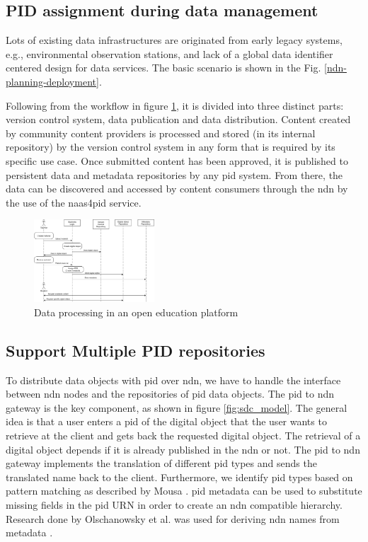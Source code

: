 \documentclass[conference]{IEEEtran}
\begin{document}
\subsection{PID assignment during data management}
Lots of existing data infrastructures are originated from early legacy systems, e.g., environmental observation stations, and lack of a global data identifier centered design for data services. The basic scenario is shown in the Fig. \ref{ndn-planning-deployment}. 

Following from the workflow in figure \ref{fig:sequence}, it is divided into three distinct parts: version control system, data publication and data distribution. Content created by community content providers is processed and stored (in its internal repository) by the version control system in any form that is required by its specific use case. Once submitted content has been approved, it is published to persistent data and metadata repositories by any \gls{pid} system. From there, the data can be discovered and accessed by content consumers through the \gls{ndn} by the use of the \gls{naas4pid} service.

\begin{figure}[h]
\centering
\label{fig:sequence}
\includegraphics[width=0.4\textwidth]{images/sequence.png}
\caption{Data processing in an open education platform}
\end{figure}


\subsection{Support Multiple PID repositories}
To distribute data objects with \gls{pid} over \gls{ndn}, we have to handle the interface between \gls{ndn} nodes and the repositories of \gls{pid} data objects. The \gls{pid} to \gls{ndn} gateway is the key component, as shown in figure \ref{fig:sdc_model}. The general idea is that a user enters a \gls{pid} of the digital object that the user wants to retrieve at the client and gets back the requested digital object. The retrieval of a digital object depends if it is already published in the \gls{ndn} or not. The \gls{pid} to \gls{ndn} gateway implements the translation of different \gls{pid} types and sends the translated name back to the client. Furthermore, we identify \gls{pid} types based on pattern matching as described by Mousa \cite{ndn-app-aware}. \gls{pid} metadata can be used to substitute missing fields in the \gls{pid} URN in order to create an \gls{ndn} compatible hierarchy. Research done by Olschanowsky et al. was used for deriving \gls{ndn} names from metadata \cite{ndn-man}.
\end{document}
